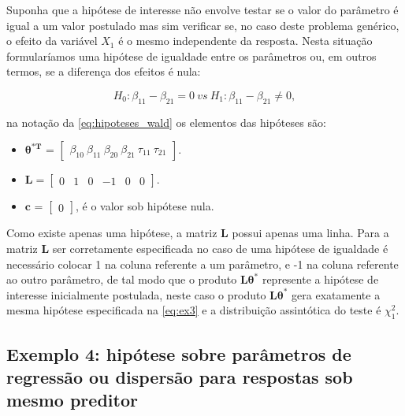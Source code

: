 Suponha que a hipótese de interesse não envolve testar se o valor do parâmetro é igual a um valor postulado mas sim verificar se, no caso deste problema genérico, o efeito da variável $X_1$ é o mesmo independente da resposta. Nesta situação formularíamos uma hipótese de igualdade entre os parâmetros ou, em outros termos, se a diferença dos efeitos é nula:

\begin{equation}
\label{eq:ex3}
H_0: \beta_{11} - \beta_{21} = 0 \ vs \ H_1: \beta_{11} - \beta_{21} \neq 0,
\end{equation}

\noindent na notação da \autoref{eq:hipoteses_wald} os elementos das hipóteses são:

\begin{itemize}
  
  \item $\boldsymbol{\theta^{*T}}$ = $\begin{bmatrix} \beta_{10} \  \beta_{11} \ \beta_{20} \ \beta_{21} \ \tau_{11} \ \tau_{21} \end{bmatrix}$.


\item $\boldsymbol{L} = \begin{bmatrix} 0 & 1 & 0 & -1 & 0 & 0  \end{bmatrix}.$
 
\item $\boldsymbol{c}$ = $\begin{bmatrix} 0 \end{bmatrix}$, é o valor sob hipótese nula. 

\end{itemize}

Como existe apenas uma hipótese, a matriz $\boldsymbol{L}$ possui apenas uma linha. Para a matriz $\boldsymbol{L}$ ser corretamente especificada no caso de uma hipótese de igualdade é necessário colocar 1 na coluna referente a um parâmetro, e -1 na coluna referente ao outro parâmetro, de tal modo que o produto $\boldsymbol{L}\boldsymbol{\theta^{*}}$ represente a hipótese de interesse inicialmente postulada, neste caso o produto $\boldsymbol{L}\boldsymbol{\theta^{*}}$ gera exatamente a mesma hipótese especificada na \autoref{eq:ex3} e a distribuição assintótica do teste é $\chi^2_1$.

\subsection{Exemplo 4: hipótese sobre parâmetros de regressão ou dispersão para respostas sob mesmo preditor}

